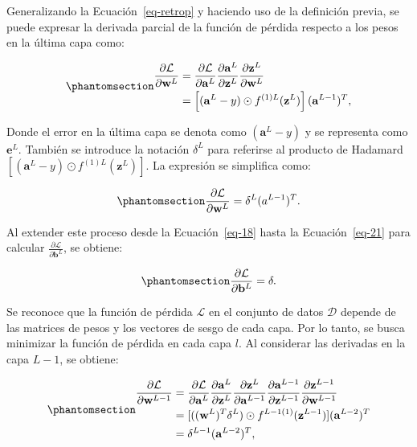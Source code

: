 \documentclass[
  us-letterpaper,
]{scrreprt}
\theoremstyle{definition}
\theoremstyle{plain}
\theoremstyle{plain}
\theoremstyle{definition}
\theoremstyle{remark}
\begin{document}
Generalizando la Ecuación~\ref{eq-retrop} y haciendo uso de la
definición previa, se puede expresar la derivada parcial de la función
de pérdida respecto a los pesos en la última capa como:

\begin{equation}\phantomsection\label{eq-20}{\begin{split}\frac{\partial \mathcal L}{\partial \mathbf w^L} &= \frac{\partial \mathcal L}{\partial \mathbf a^L}\frac{\partial \mathbf a^L}{\partial \mathbf z^L}\frac{\partial \mathbf z^L}{\partial \mathbf w^L}\\&= \left[(\mathbf a^L - y)\odot f^{(1)L}(\mathbf z^L)\right] (\mathbf a^{L-1})^T,\end{split}}\end{equation}

Donde el error en la última capa se denota como \((\mathbf a^L - y)\) y
se representa como \(\mathbf e^L\). También se introduce la notación
\(\delta^L\) para referirse al producto de Hadamard
\([(\mathbf a^L - y)\odot f^{(1)L}(\mathbf z^L)]\). La expresión se
simplifica como:

\begin{equation}\phantomsection\label{eq-21}{\frac{\partial \mathcal L}{\partial \mathbf w^L} = \delta^L (a^{L-1})^T.}\end{equation}

Al extender este proceso desde la Ecuación~\ref{eq-18} hasta la
Ecuación~\ref{eq-21} para calcular
\(\frac{\partial \mathcal L}{\partial \mathbf b^L}\), se obtiene:

\begin{equation}\phantomsection\label{eq-22}{\frac{\partial \mathcal L}{\partial \mathbf b^L} = \delta.}\end{equation}

Se reconoce que la función de pérdida \(\mathcal L\) en el conjunto de
datos \(\mathscr D\) depende de las matrices de pesos y los vectores de
sesgo de cada capa. Por lo tanto, se busca minimizar la función de
pérdida en cada capa \(l\). Al considerar las derivadas en la capa
\(L-1\), se obtiene:

\begin{equation}\phantomsection\label{eq-23}{
\begin{split}\frac{\partial \mathcal L}{\partial \mathbf w^{L-1}}&= \frac{\partial \mathcal L}{\partial \mathbf a^{L}}\frac{\partial \mathbf a^L}{\partial \mathbf z^{L}}\frac{\partial \mathbf z^L}{\partial \mathbf a^{L-1}}\frac{\partial \mathbf a^{L-1}}{\partial \mathbf z^{L-1}}\frac{\partial \mathbf z^{L-1}}{\partial \mathbf w^{L-1}}\\
&= [((\mathbf w^L)^T \delta^L)\odot f^{L-1(1)}(\mathbf z^{L-1})](\mathbf a^{L-2})^T\\
&= \delta^{L-1}(\mathbf a^{L-2})^T,\end{split}
}\end{equation}
\end{document}

